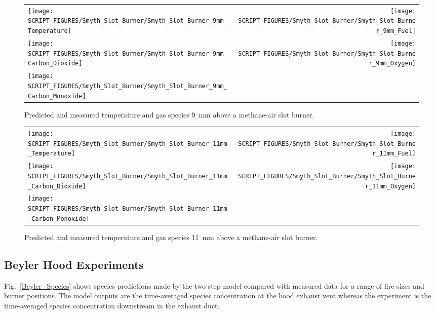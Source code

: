 \begin{figure}[p]
\begin{tabular*}{\textwidth}{l@{\extracolsep{\fill}}r}
\texttt{[image: SCRIPT\_FIGURES/Smyth\_Slot\_Burner/Smyth\_Slot\_Burner\_9mm\_Temperature]} &
\texttt{[image: SCRIPT\_FIGURES/Smyth\_Slot\_Burner/Smyth\_Slot\_Burner\_9mm\_Fuel]} \\
\texttt{[image: SCRIPT\_FIGURES/Smyth\_Slot\_Burner/Smyth\_Slot\_Burner\_9mm\_Carbon\_Dioxide]} &
\texttt{[image: SCRIPT\_FIGURES/Smyth\_Slot\_Burner/Smyth\_Slot\_Burner\_9mm\_Oxygen]} \\
\texttt{[image: SCRIPT\_FIGURES/Smyth\_Slot\_Burner/Smyth\_Slot\_Burner\_9mm\_Carbon\_Monoxide]} &
\end{tabular*}
\caption[Temperature and gas species predictions 9~mm above burner, Smyth experiment]
{Predicted and measured temperature and gas species 9~mm above a methane-air slot burner.}
\label{Smyth_Slot_Burner_9}
\end{figure}

\begin{figure}[p]
\begin{tabular*}{\textwidth}{l@{\extracolsep{\fill}}r}
\texttt{[image: SCRIPT\_FIGURES/Smyth\_Slot\_Burner/Smyth\_Slot\_Burner\_11mm\_Temperature]} &
\texttt{[image: SCRIPT\_FIGURES/Smyth\_Slot\_Burner/Smyth\_Slot\_Burner\_11mm\_Fuel]} \\
\texttt{[image: SCRIPT\_FIGURES/Smyth\_Slot\_Burner/Smyth\_Slot\_Burner\_11mm\_Carbon\_Dioxide]} &
\texttt{[image: SCRIPT\_FIGURES/Smyth\_Slot\_Burner/Smyth\_Slot\_Burner\_11mm\_Oxygen]} \\
\texttt{[image: SCRIPT\_FIGURES/Smyth\_Slot\_Burner/Smyth\_Slot\_Burner\_11mm\_Carbon\_Monoxide]} &
\end{tabular*}
\caption[Temperature and gas species predictions 11~mm above burner, Smyth experiment]
{Predicted and measured temperature and gas species 11~mm above a methane-air slot burner.}
\label{Smyth_Slot_Burner_11}
\end{figure}



\clearpage

\subsection{Beyler Hood Experiments}

Fig.~\ref{Beyler_Species} shows species predictions made by the two-step model compared with measured data for a range of fire sizes and burner positions.  The model outputs are the time-averaged species concentration at the hood exhaust vent whereas the experiment is the time-averaged species concentration downstream in the exhaust duct.

